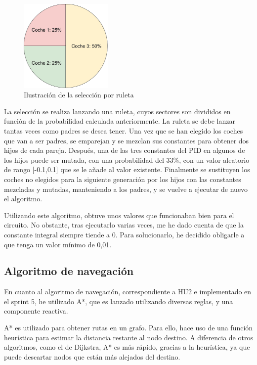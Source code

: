 \bigskip
\begin{figure}[H]
    \centering
    \includegraphics[width=0.4\textwidth]{imagenes/converted/ruleta.jpg}
    \caption{Ilustración de la selección por ruleta}
    \label{fig:ruleta}
\end{figure}

La selección se realiza lanzando una ruleta\cite{gaperformance}, cuyos sectores son divididos en función de la probabilidad calculada anteriormente. La ruleta se debe lanzar tantas veces como padres se desea tener. Una vez que se han elegido los coches que van a ser padres, se emparejan y se mezclan sus constantes para obtener dos hijos de cada pareja. Después, una de las tres constantes del PID en algunos de los hijos puede ser mutada, con una probabilidad del 33\%, con un valor aleatorio de rango [-0.1,0.1] que se le añade al valor existente. Finalmente se sustituyen los coches no elegidos para la siguiente generación por los hijos con las constantes mezcladas y mutadas, manteniendo a los padres, y se vuelve a ejecutar de nuevo el algoritmo.

\bigskip

Utilizando este algoritmo, obtuve unos valores que funcionaban bien para el circuito. No obstante, tras ejecutarlo varias veces, me he dado cuenta de que la constante integral siempre tiende a 0. Para solucionarlo, he decidido obligarle a que tenga un valor mínimo de 0,01.


\subsection{Algoritmo de navegación}

En cuanto al algoritmo de navegación, correspondiente a HU2 e implementado en el sprint 5, he utilizado A*\cite{4082128}, que es lanzado utilizando diversas reglas, y una componente reactiva. 

\bigskip

A* es utilizado para obtener rutas en un grafo. Para ello, hace uso de una función heurística para estimar la distancia restante al nodo destino. A diferencia de otros algoritmos, como el de Dijkstra, A* es más rápido, gracias a la heurística, ya que puede descartar nodos que están más alejados del destino.

